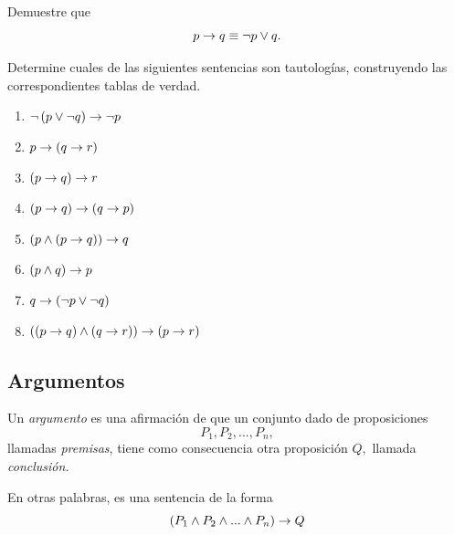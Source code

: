  \begin{problema}
  Demuestre que $$p\rightarrow q \equiv \neg p \vee q.$$
 \end{problema}




 \begin{problema} Determine cuales de las siguientes sentencias son tautologías, construyendo las correspondientes tablas de verdad.
  \begin{enumerate}
   \item $\neg\left( p \vee \neg q \right) \rightarrow \neg p$
   \item $p \rightarrow \left( q\rightarrow r \right)$
   \item $\left( p \rightarrow q \right)\rightarrow r$
   \item $\left( p\rightarrow q \right) \rightarrow \left( q\rightarrow p \right)$
   \item $\left( p \wedge \left( p \rightarrow q \right) \right) \rightarrow q$
   \item $\left( p \wedge q \right) \rightarrow p$
   \item $q \rightarrow \left( \neg p \vee \neg q \right)$
   \item $\left( \left( p\rightarrow q \right) \wedge \left( q \rightarrow r \right) \right) \rightarrow \left( p \rightarrow r \right)$
  \end{enumerate}

 \end{problema}



\subsection{Argumentos}


 Un \emph{argumento} es una afirmación de que un conjunto dado de proposiciones $$P_{1}, P_{2},...,P_{n},$$ llamadas \emph{premisas}, tiene como consecuencia otra proposición $Q,$ llamada \emph{conclusión.}
 
 En otras palabras, es una sentencia de la forma
 $$
  \left( P_{1} \wedge P_{2} \wedge...\wedge P_{n}\right) \rightarrow Q
  $$
 
